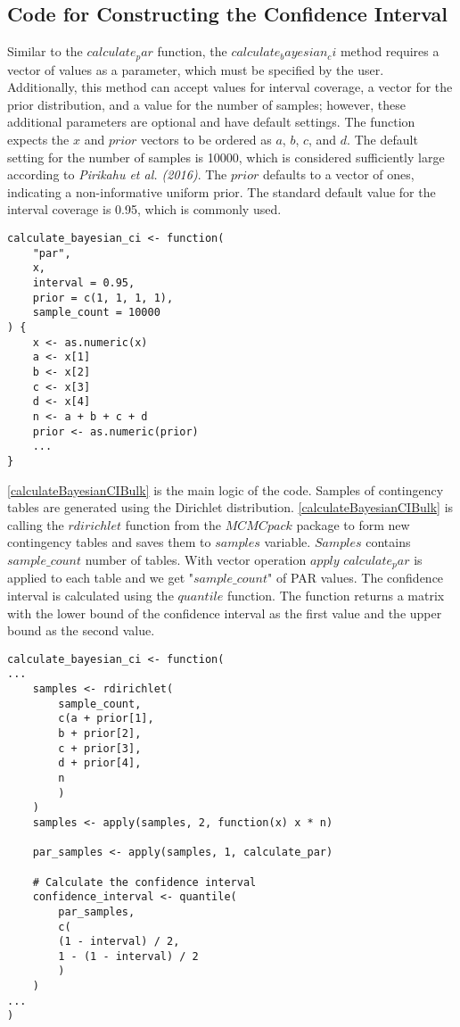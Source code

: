 \subsection{Code for Constructing the Confidence Interval}

Similar to the $calculate_par$ function, the $calculate_bayesian_ci$ method requires a vector of values as a parameter, which must be specified by the user. Additionally, this method can accept values for interval coverage, a vector for the prior distribution, and a value for the number of samples; however, these additional parameters are optional and have default settings. The function expects the $x$ and $prior$ vectors to be ordered as $a$, $b$, $c$, and $d$. The default setting for the number of samples is 10000, which is considered sufficiently large according to \textit{Pirikahu et al. (2016)}. The $prior$ defaults to a vector of ones, indicating a non-informative uniform prior. The standard default value for the interval coverage is 0.95, which is commonly used.

\begin{lstlisting}
calculate_bayesian_ci <- function(
    "par",
    x,
    interval = 0.95,
    prior = c(1, 1, 1, 1),
    sample_count = 10000
) {
    x <- as.numeric(x)
    a <- x[1]
    b <- x[2]
    c <- x[3]
    d <- x[4]
    n <- a + b + c + d
    prior <- as.numeric(prior)
    ...
}
\end{lstlisting}

\ref{calculateBayesianCIBulk} is the main logic of the code. Samples of contingency tables are generated using the Dirichlet distribution. \ref{calculateBayesianCIBulk} is calling the $rdirichlet$ function from the $MCMCpack$ package to form new contingency tables and saves them to $samples$ variable. $Samples$ contains $sample\_count$ number of tables. With vector operation $apply$ $calculate_par$ is applied to each table and we get "$sample\_count$" of PAR values. The confidence interval is calculated using the $quantile$ function. The function returns a matrix with the lower bound of the confidence interval as the first value and the upper bound as the second value.

\begin{lstlisting}
calculate_bayesian_ci <- function(
...
    samples <- rdirichlet(
        sample_count,
        c(a + prior[1],
        b + prior[2],
        c + prior[3],
        d + prior[4],
        n
        )
    )
    samples <- apply(samples, 2, function(x) x * n)
    
    par_samples <- apply(samples, 1, calculate_par)
    
    # Calculate the confidence interval
    confidence_interval <- quantile(
        par_samples,
        c(
        (1 - interval) / 2,
        1 - (1 - interval) / 2
        )
    )
...
)
\end{lstlisting}\label{calculateBayesianCIBulk}

